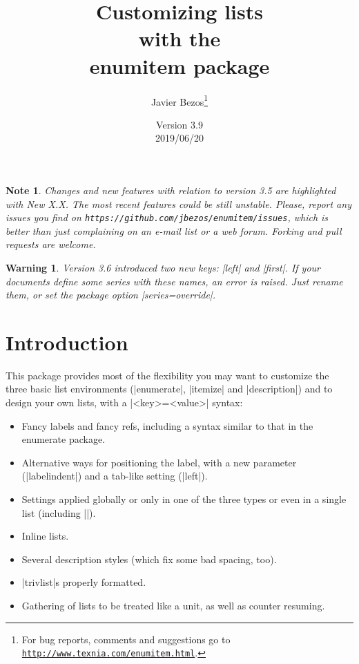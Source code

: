 \documentclass[a4paper]{ltxguide}
\title{Customizing lists\\with the\\\textsf{enumitem} package}
\author{Javier Bezos\footnote{For bug reports, comments and
suggestions go to \href{http://www.texnia.com/enumitem.html}%
{\texttt{http://www.texnia.com/enumitem.html}}.}}
\date{Version 3.9\\2019/06/20}  %
\newtheorem{warning}{Warning}
\newtheorem{note}{Note}
\newcommand\New[1]{%
  \colorbox[rgb]{.87, .9, .83}{New #1}\enspace\ignorespaces}
\begin{document}
\maketitle
\tableofcontents

\newpage

\vspace*{1cm}

\begin{note}
  Changes and new features with relation to version 3.5 are highlighted
  with \New{X.X}\hspace{-.5em}. The most recent features could be still
  unstable. Please, report any issues you find on
  \texttt{https://github.com/jbezos/enumitem/issues}, which is better
  than just complaining on an e-mail list or a web forum. Forking
  and pull requests are welcome.
\end{note}

\begin{warning}
  Version 3.6 introduced two new keys: |left| and |first|. If your
  documents define some series with these names, an error is raised.
  Just rename them, or set the package option |series=override|.
\end{warning}

\section{Introduction}

This package provides most of the flexibility you may want to customize
the three basic list environments (|enumerate|, |itemize| and
|description|) and to design your own lists, with a |<key>=<value>|
syntax:
\begin{itemize}
\item Fancy labels and fancy refs, including a syntax similar to that
in the \textsf{enumerate} package.

\item Alternative ways for positioning the label, with a new 
  parameter (|labelindent|) and a tab-like setting (|left|).

\item Settings applied globally or only in one of the three types or
even in a single list (including |\topsep|).

\item Inline lists.

\item Several description styles (which fix some bad spacing, too).

\item |trivlist|s properly formatted.

\item Gathering of lists to be treated like a unit, as well as counter 
resuming.

\end{itemize}
\end{document}
